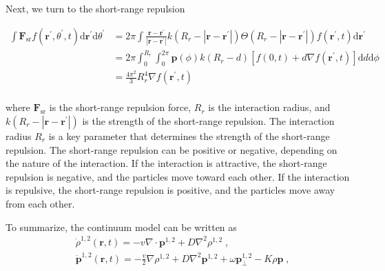 \documentclass[a4paper, amsfonts, amssymb, amsmath, reprint, showkeys, showpacs, nofootinbib, twoside]{revtex4-2}
\begin{document}
Next, we turn to the short-range repulsion
\begin{widetext}
\begin{equation}
    \begin{aligned}
        \int{\boldsymbol{F}_{\mathrm{sr}}f\left( \mathbf{r}^{\prime},\theta ^{\prime},t \right) \mathrm{d}\mathbf{r}^{\prime}\mathrm{d}\theta ^{\prime}}&=2\pi \int{\frac{\mathbf{r}-\mathbf{r}^{\prime}}{\left| \mathbf{r}-\mathbf{r}^{\prime} \right|}k\left( R_r-\left| \mathbf{r}-\mathbf{r}^{\prime} \right| \right) \Theta \left( R_r-\left| \mathbf{r}-\mathbf{r}^{\prime} \right| \right) f\left( \mathbf{r}^{\prime},t \right) \mathrm{d}\mathbf{r}^{\prime}}\\
        &=2\pi \int_0^{R_r}{\int_0^{2\pi}{\mathbf{p}\left( \phi \right) k\left( R_r-d \right) \left[ f\left( 0,t \right) +d\nabla f\left( \mathbf{r}^{\prime},t \right) \right] \mathrm{d}d\mathrm{d}\phi}}\\
        &=\frac{4\pi ^2}{3}R_{r}^{4}\nabla f\left( \mathbf{r}^{\prime},t \right)\\
    \end{aligned}
\end{equation}
\end{widetext}
where $\boldsymbol{F}_{\mathrm{sr}}$ is the short-range repulsion force, $R_r$ is the interaction radius, and $k\left( R_r-\left| \mathbf{r}-\mathbf{r}^{\prime} \right| \right)$ is the strength of the short-range repulsion. The interaction radius $R_r$ is a key parameter that determines the strength of the short-range repulsion. The short-range repulsion can be positive or negative, depending on the nature of the interaction. If the interaction is attractive, the short-range repulsion is negative, and the particles move toward each other. If the interaction is repulsive, the short-range repulsion is positive, and the particles move away from each other.

To summarize, the continuum model can be written as
\begin{subequations}
    \begin{align}
        &\dot{\rho}^{1,2}\left( \mathbf{r},t \right) =-v\nabla \cdot \boldsymbol{p}^{1,2}+D\nabla ^2\rho ^{1,2}\;,\\
        &\dot{\boldsymbol{p}}^{1,2}\left( \mathbf{r},t \right) =-\frac{v}{2}\nabla \rho ^{1,2}+D\nabla ^2\boldsymbol{p}^{1,2}+\omega \boldsymbol{p}_{\bot}^{1,2}-K\rho\boldsymbol{p}\;,
    \end{align}
\end{subequations}
\end{document}
